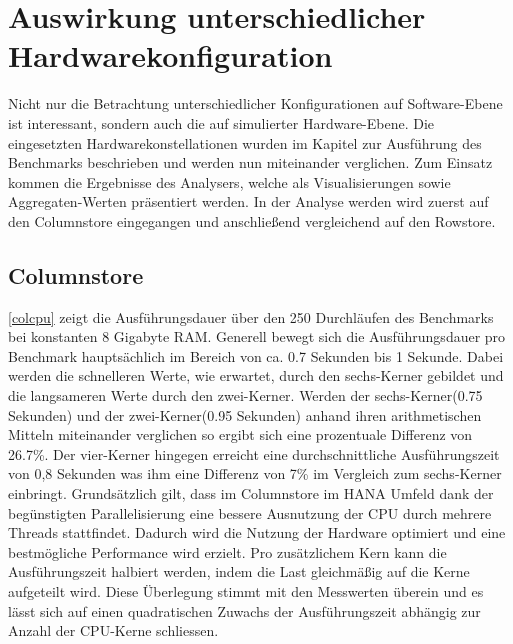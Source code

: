 \section{Auswirkung unterschiedlicher Hardwarekonfiguration}\label{auswertung:hardware}

Nicht nur die Betrachtung unterschiedlicher Konfigurationen auf Software-Ebene ist interessant, sondern auch die auf simulierter Hardware-Ebene. Die eingesetzten Hardwarekonstellationen wurden im Kapitel zur Ausführung des Benchmarks beschrieben und werden nun miteinander verglichen. Zum Einsatz kommen die Ergebnisse des Analysers, welche als Visualisierungen sowie Aggregaten-Werten präsentiert werden. In der Analyse werden wird zuerst auf den Columnstore eingegangen und anschließend vergleichend auf den Rowstore. 

\subsection{Columnstore}

\begin{figure}[H]
\end{figure}


\autoref{colcpu} zeigt die Ausführungsdauer über den 250 Durchläufen des Benchmarks bei konstanten 8 Gigabyte RAM. Generell bewegt sich die Ausführungsdauer pro Benchmark hauptsächlich im Bereich von ca. 0.7 Sekunden bis 1 Sekunde. Dabei werden die schnelleren Werte, wie erwartet, durch den sechs-Kerner gebildet und die langsameren Werte durch den zwei-Kerner. Werden der sechs-Kerner(0.75 Sekunden) und der zwei-Kerner(0.95 Sekunden) anhand ihren arithmetischen Mitteln miteinander verglichen so ergibt sich eine prozentuale Differenz von 26.7\%. Der vier-Kerner hingegen erreicht eine durchschnittliche Ausführungszeit von 0,8 Sekunden was ihm eine Differenz von 7\% im Vergleich zum sechs-Kerner einbringt. 
Grundsätzlich gilt, dass im Columnstore im HANA Umfeld dank der begünstigten Parallelisierung eine bessere Ausnutzung der CPU durch mehrere Threads stattfindet. Dadurch wird die Nutzung der Hardware optimiert und eine bestmögliche Performance wird erzielt. Pro zusätzlichem Kern kann die Ausführungszeit halbiert werden, indem die Last gleichmäßig auf die Kerne aufgeteilt wird. Diese Überlegung stimmt mit den Messwerten überein und es lässt sich auf einen quadratischen Zuwachs der Ausführungszeit abhängig zur Anzahl der CPU-Kerne schliessen. 

